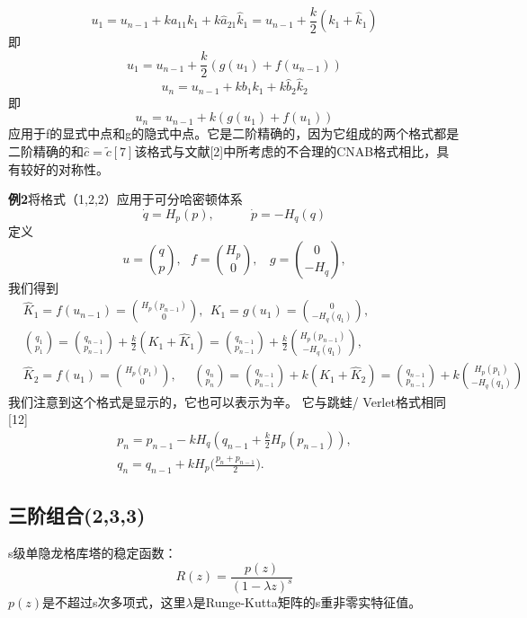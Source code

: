 \documentclass[12pt,a4paper]{article}
\begin{document}
\begin{equation*}
u_{1}=u_{n-1}+ka_{11}k_{1}+k\hat{a}_{21}\hat{k}_{1}=u_{n-1}+\frac{k}{2}(k_{1}+\hat{k}_{1})
\end{equation*}
即
\begin{equation*}
u_{1}=u_{n-1}+\frac{k}{2}(g(u_{1})+f(u_{n-1}))
\end{equation*}
\begin{equation*}
u_{n}=u_{n-1}+kb_{1}k_{1}+k\hat{b}_{2}\hat{k}_{2}
\end{equation*}
即
\begin{equation*}
u_{n}=u_{n-1}+k(g(u_{1})+f(u_{1}))
\end{equation*}
应用于f的显式中点和g的隐式中点。它是二阶精确的，因为它组成的两个格式都是二阶精确的和$\widehat{c}=\tilde{c}[7]$该格式与文献[2]中所考虑的不合理的CNAB格式相比，具有较好的对称性。

\textbf{例2}将格式（1,2,2）应用于可分哈密顿体系
\begin{equation}
\dot{q}=H_{p}(p),~~~~~~~~~~~~~\dot{p}=-H_{q}(q)
\end{equation}
定义
\begin{equation}
u=\binom{q}{p},~~~f=\binom{H_{p}}{0},~~~~g=\binom{0}{-H_{q}},
\end{equation}
我们得到
\begin{align}
&\widehat{K}_{1}=f(u_{n-1})=\binom{H_{p}(p_{n-1})}{0},~~K_{1}=g(u_{1})=\binom{0}{-H_{q}(q_{1})},\\
&\binom{q_{1}}{p_{1}}=\binom{q_{n-1}}{p_{n-1}}+\frac{k}{2}(K_{1}+\widehat{K}_{1})=\binom{q_{n-1}}{p_{n-1}}+\frac{k}{2}\binom{H_{p}(p_{n-1})}{-H_{q}(q_{1})},\\
&\widehat{K}_{2}=f(u_{1})=\binom{H_{p}(p_{1})}{0},~~~~~~\binom{q_{n}}{p_{n}}=\binom{q_{n-1}}{p_{n-1}}+k(K_{1}+\widehat{K}_{2})=\binom{q_{n-1}}{p_{n-1}}+k\binom{H_{p}(p_{1})}{-H_{q}(q_{1})}
\end{align}
我们注意到这个格式是显示的，它也可以表示为辛。 它与跳蛙/ Verlet格式相同[12] 
\begin{gather}
p_{n}=p_{n-1}-kH_{q}(q_{n-1}+\frac{k}{2}H_{p}(p_{n-1})),\\
q_{n}=q_{n-1}+kH_{p}\bigg(\frac{p_{n}+p_{n-1}}{2}\biggl).
\end{gather}
\subsection{三阶组合(2,3,3)}
s级单隐龙格库塔的稳定函数：
\begin{equation*}
R(z)=\frac{p(z)}{(1-\lambda z)^s}
\end{equation*}
$p(z)$是不超过s次多项式，这里$\lambda$是Runge-Kutta矩阵的s重非零实特征值。
\end{document}
